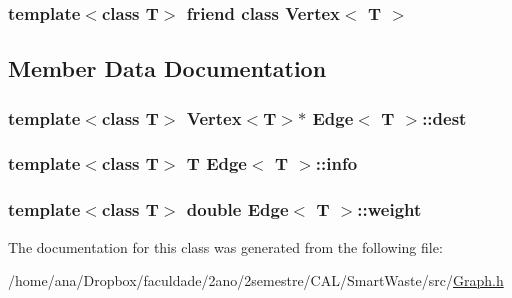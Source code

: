 \subsubsection[{\texorpdfstring{Vertex$<$ T $>$}{Vertex< T >}}]{\setlength{\rightskip}{0pt plus 5cm}template$<$class T$>$ friend class {\bf Vertex}$<$ T $>$\hspace{0.3cm}{\ttfamily [friend]}}\hypertarget{classEdge_a2e120a12dec663fa334633b4f26cbed8}{}\label{classEdge_a2e120a12dec663fa334633b4f26cbed8}


\subsection{Member Data Documentation}
\subsubsection[{\texorpdfstring{dest}{dest}}]{\setlength{\rightskip}{0pt plus 5cm}template$<$class T$>$ {\bf Vertex}$<$T$>$$\ast$ {\bf Edge}$<$ T $>$\+::dest\hspace{0.3cm}{\ttfamily [private]}}\hypertarget{classEdge_ae4d65678b91bd9d814af4720ad87cd0c}{}\label{classEdge_ae4d65678b91bd9d814af4720ad87cd0c}
\subsubsection[{\texorpdfstring{info}{info}}]{\setlength{\rightskip}{0pt plus 5cm}template$<$class T$>$ T {\bf Edge}$<$ T $>$\+::info\hspace{0.3cm}{\ttfamily [private]}}\hypertarget{classEdge_a3c76337d535f346456b825b3cbc88b14}{}\label{classEdge_a3c76337d535f346456b825b3cbc88b14}
\subsubsection[{\texorpdfstring{weight}{weight}}]{\setlength{\rightskip}{0pt plus 5cm}template$<$class T$>$ double {\bf Edge}$<$ T $>$\+::weight\hspace{0.3cm}{\ttfamily [private]}}\hypertarget{classEdge_af188b57b604f0d65e2da48733bd76426}{}\label{classEdge_af188b57b604f0d65e2da48733bd76426}


The documentation for this class was generated from the following file\+:\begin{DoxyCompactItemize}
\item 
/home/ana/\+Dropbox/faculdade/2ano/2semestre/\+C\+A\+L/\+Smart\+Waste/src/\hyperlink{Graph_8h}{Graph.\+h}\end{DoxyCompactItemize}
